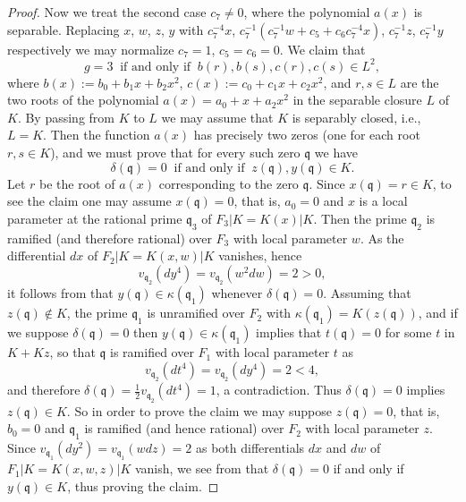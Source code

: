 \documentclass[12pt,reqno]{amsart}
\newcommand{\todoo}[2][]{\todo[size=tiny, #1]{#2}} %
\newcommand{\toda}[2][]{\todo[color=blue!30, #1]{#2}} %
\theoremstyle{definition}
\newcommand{\pp}{\mathfrak{p}}
\newcommand{\fq}{\mathfrak{q}}
\newcommand{\de}{\delta}
\newcommand{\ka}{\kappa}
\begin{document}
\begin{proof}
Now we treat the second case $c_7 \neq 0$, where the polynomial $a(x)$ is separable. 
Replacing $x$, $w$, $z$, $y$ with $c_7^{-4} x$, 
$c_7^{-1} (c_7^{-1} w + c_5 + c_6 c_7^{-4} x)$, 
$c_7^{-1} z$, $c_7^{-1} y$ respectively we may normalize $c_7 = 1$, $c_5 = c_6 = 0$.
We claim that
\[ g = 3 \ \text{ if and only if } \  b(r),b(s),c(r),c(s) \in L^2, \]
where $b(x):= b_0 + b_1 x + b_2 x^2$, $c(x) := c_0 + c_1 x + c_2 x^2$, and $r,s \in L$ are the two roots of the polynomial 
$ a(x) = a_0 + x + a_2 x^2 $
in the separable closure $L$ of $K$.
By passing from $K$ to $L$ we may assume that $K$ is separably closed, i.e., $L=K$.
Then the function $a(x)$ has precisely two zeros (one for each root $r,s\in K$), and we must prove that for every such zero $\fq$ we have
\[ \de(\fq)=0 \ \text{ if and only if } \ z(\fq),y(\fq) \in K. \]
Let $r$ be the root of $a(x)$ corresponding to the zero $\fq$.
Since $x(\fq) = r \in K$, to see the claim one may assume $x(\fq) = 0$, that is, $a_0 = 0$ and $x$ is a local parameter at the rational prime $\fq_3$ of $F_3|K = K(x)|K$.
Then the prime $\fq_2$ is ramified (and therefore rational) over $F_3$ with local parameter $w$. 
As the differential $dx$ of $F_2|K = K(x,w)|K$ vanishes, hence
\[ v_{\fq_2}(dy^4) = v_{\fq_2}(w^2 dw) = 2 > 0, \]
it follows from \cite[Theorem~2.3]{BedSt87} that $y(\fq) \in \ka({\fq_1})$ whenever $\de(\fq)= 0$. 
Assuming that $z(\fq) \notin K$, the prime $\fq_1$ is unramified over $F_2$ with $\ka({\fq_1}) = K(z(\fq))$, and if we suppose $\de(\fq) = 0$ then $y(\fq) \in \ka({\fq_1})$ implies that $t(\fq) = 0$ for some $t$ in $K + Kz$, 
so that $\fq$ is ramified over $F_1$ with local parameter $t$ as
\[ v_{\fq_2}(dt^4) = v_{\fq_2}(dy^4) = 2 < 4, \]
and therefore $\de({\fq}) = \frac12 v_{\fq_2}(dt^4) = 1$, a contradiction. Thus $\de(\fq) = 0$ implies $z(\fq) \in K$. 
So in order to prove the claim we may suppose $z(\fq) = 0$, that is, $b_0 = 0$ and
$\fq_1$ is ramified (and hence rational) over $F_2$ with local parameter $z$.
Since $v_{\fq_1}(dy^2) = v_{\fq_1}(w dz) = 2$ as both differentials $dx$ and $dw$ of $F_1|K = K(x,w,z)|K$ vanish, we see from
\cite[Proposition~4.1]{BedSt87} that $\de(\fq) = 0$ if and only if $y(\fq) \in K$, thus proving the claim. 









\end{proof}
\end{document}
